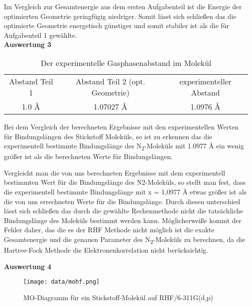 \documentclass[12pt]{article}
\begin{document}
\begin{onehalfspace}
Im Vergleich zur Gesamtenergie aus dem ersten Aufgabenteil ist die Energie der optimierten Geometrie geringfügig niedriger. Somit lässt sich schließen das die optimierte Geometrie energetisch günstiger und somit stabiler ist als die für Aufgabenteil 1 gewählte.\\

\textbf{Auswertung 3}\\
\begin{table}[!htpb]
\centering
\caption{Der experimentelle Gasphasenabstand im  Molekül }
\begin{tabular}{ccc}
\toprule
Abstand Teil 1 & Abstand Teil 2 (opt. Geometrie)  & experimenteller Abstand \\
1.0 \si{\angstrom} & 1.07027 \si{\angstrom} & 1.0976 \si{\angstrom} \\
\midrule
\bottomrule
\end{tabular}
\end{table}
\noindent
Bei dem Vergleich der berechneten Ergebnisse mit den experimentellen Werten für Bindungslängen des Stickstoff Moleküls, so ist zu erkennen das die experimentell bestimmte Bindungslänge des N\textsubscript{2}-Moleküls mit 1.0977 \si{\angstrom} ein wenig größer ist als die berechneten Werte für Bindungslängen.

Vergleicht man die von uns berechneten Ergebnisse mit dem experimentell
bestimmten Wert für die Bindungslänge des N2-Moleküls, so stellt man fest, dass
die experimentell bestimmte Bindungslänge mit x = 1,0977 Å etwas größer ist als
die von uns errechneten Werte für die Bindungslänge. 
Durch diesen unterschied lässt sich schließen das durch die gewählte Rechenmethode nicht die tatsächliche Bindungslänge des Moleküls bestimmt werden kann. Möglicherweiße kommt der Fehler daher, das die es der RHF Methode nicht möglich ist die exakte Gesamtenergie und die genauen Parameter des N\textsubscript{2}-Moleküls zu berechnen, da die Hartree-Fock Methode die Elektronenkorrelation nicht berücksichtig. 

\newpage

\textbf{Auswertung 4}\\
\begin{figure}[!htpb]
   \centering
\texttt{[image: data/mohf.png]}
\caption{MO-Diagramm für ein Stickstoff-Molekül auf RHF/6-311G(d,p)}
\end{figure}


\end{onehalfspace}
\end{document}

